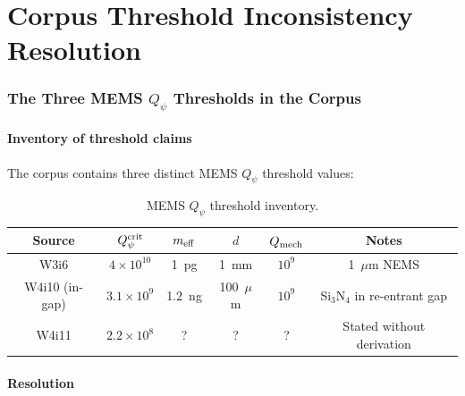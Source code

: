 \documentclass[11pt]{article}
\newcommand{\ee}[1]{\times 10^{#1}}
\newcommand{\Qpsi}{Q_\psi}
\theoremstyle{definition}
\theoremstyle{remark}
\begin{document}
\part{Corpus Threshold Inconsistency Resolution}
\label{part:threshold}


\section{The Three MEMS $\Qpsi$ Thresholds in the Corpus}
\label{sec:thresholds}

\subsection{Inventory of threshold claims}

The corpus contains three distinct MEMS $\Qpsi$ threshold values:

\begin{table}[H]
\centering
\caption{MEMS $\Qpsi$ threshold inventory.}
\label{tab:thresholds}
\renewcommand{\arraystretch}{1.4}
\begin{tabular}{@{}cccccc@{}}
\toprule
\textbf{Source} & $\Qpsi^{\rm crit}$ & $m_{\rm eff}$ & $d$
& $Q_{\rm mech}$ & \textbf{Notes} \\
\midrule
\rowcolor{rowhi}
W3i6 & $4\ee{10}$ & 1~pg & 1~mm & $10^{9}$ & 1~$\mu$m NEMS \\
\rowcolor{rowmed}
W4i10 (in-gap) & $3.1\ee{9}$ & 1.2~ng & 100~$\mu$m & $10^9$
& Si$_3$N$_4$ in re-entrant gap \\
\rowcolor{rowhi}
W4i11 & $2.2\ee{8}$ & ? & ? & ? & Stated without derivation \\
\bottomrule
\end{tabular}
\end{table}

\subsection{Resolution}
\end{document}
